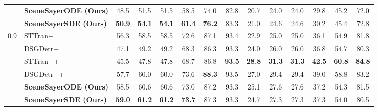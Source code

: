 \begin{table}[!h]
{\begin{tabular}{ll|cccccc|cccccc}
        &        \textbf{SceneSayerODE (Ours)} & 48.5 & 51.5 & 51.5 & 58.5 & 74.0 & 82.8 & 20.7 & 24.0 & 24.0 & 29.8 & 45.2 & 72.0  \\ 
        &        \textbf{SceneSayerSDE (Ours)} & \cellcolor{highlightColor} \textbf{50.9} & \cellcolor{highlightColor} \textbf{54.1} & \cellcolor{highlightColor} \textbf{54.1} & \cellcolor{highlightColor} \textbf{61.4} & \cellcolor{highlightColor} \textbf{76.2} & 83.3 & 21.0 & 24.6 & 24.6 & 30.2 & 45.4 & 72.8  \\ 
          \cmidrule(lr){2-7} \cmidrule(lr){8-13} 
        \multirow{6}{*}{0.9} &        STTran+ \cite{cong_et_al_sttran_2021} & 56.3 & 58.5 & 58.5 & 72.6 & 87.1 & 93.4 & 22.9 & 25.0 & 25.0 & 36.1 & 54.9 & 81.8  \\ 
        &        DSGDetr+ \cite{Feng_2021} & 47.1 & 49.2 & 49.2 & 68.3 & 86.3 & 93.3 & 24.0 & 26.0 & 26.0 & 36.8 & 54.7 & 80.3  \\ 
        &        STTran++ \cite{cong_et_al_sttran_2021} & 45.5 & 47.8 & 47.8 & 68.7 & 86.8 & \cellcolor{highlightColor} \textbf{93.5} & \cellcolor{highlightColor} \textbf{28.8} & \cellcolor{highlightColor} \textbf{31.3} & \cellcolor{highlightColor} \textbf{31.3} & \cellcolor{highlightColor} \textbf{42.5} & \cellcolor{highlightColor} \textbf{60.8} & \cellcolor{highlightColor} \textbf{84.8}  \\ 
        &        DSGDetr++ \cite{Feng_2021} & 57.7 & 60.0 & 60.0 & 73.6 & \cellcolor{highlightColor} \textbf{88.3} & 93.5 & 27.0 & 29.4 & 29.4 & 39.0 & 58.8 & 83.2  \\ 
        &        \textbf{SceneSayerODE (Ours)} & 58.5 & 60.6 & 60.6 & 73.0 & 87.2 & 93.3 & 25.1 & 27.6 & 27.6 & 37.2 & 54.3 & 81.5  \\ 
        &        \textbf{SceneSayerSDE (Ours)} & \cellcolor{highlightColor} \textbf{59.0} & \cellcolor{highlightColor} \textbf{61.2} & \cellcolor{highlightColor} \textbf{61.2} & \cellcolor{highlightColor} \textbf{73.7} & 87.3 & 93.3 & 24.7 & 27.3 & 27.3 & 37.3 & 54.0 & 80.5  \\ 
          \hline 
    \end{tabular}
    }
\end{table}
